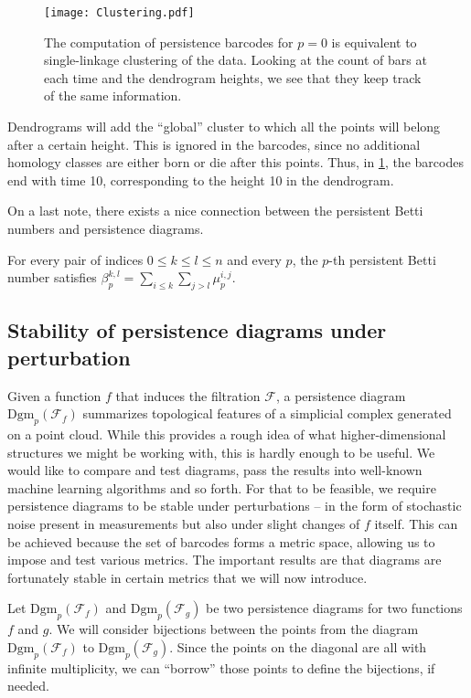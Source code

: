 \begin{figure}[h!]
  \centering
  \texttt{[image: Clustering.pdf]}
  \caption{The computation of persistence barcodes for $p=0$ is equivalent to single-linkage clustering of the data. Looking at the count of bars at each time and the dendrogram heights, we see that they keep track of the same information.}
  \label{fig:clustering}
\end{figure}

Dendrograms will add the ``global'' cluster to which all the points will belong after a certain height. This is ignored in the barcodes, since no additional homology classes are either born or die after this points. Thus, in \ref{fig:clustering}, the barcodes end with time 10, corresponding to the height 10 in the dendrogram.

On a last note, there exists a nice connection between the persistent Betti numbers and persistence diagrams.
\begin{theorem}
  For every pair of indices $0 \leq k \leq l \leq n$ and every $p$, the $p$-th persistent Betti number satisfies $\beta_{p}^{k,l} = \sum_{i \leq k}\sum_{j > l}\mu^{i,j}_{p}$.
\end{theorem}

\subsection{Stability of persistence diagrams under perturbation}
Given a function $f$ that induces the filtration $\mathcal{F}$, a persistence diagram $\text{Dgm}_{p}(\mathcal{F}_{f})$ summarizes topological features of a simplicial complex generated on a point cloud. While this provides a rough idea of what higher-dimensional structures we might be working with, this is hardly enough to be useful. We would like to compare and test diagrams, pass the results into well-known machine learning algorithms and so forth. For that to be feasible, we require persistence diagrams to be stable under perturbations -- in the form of stochastic noise present in measurements but also under slight changes of $f$ itself. This can be achieved because the set of barcodes forms a metric space, allowing us to impose and test various metrics. The important results are that diagrams are fortunately stable in certain metrics that we will now introduce.

Let $\text{Dgm}_{p}(\mathcal{F}_{f})$ and $\text{Dgm}_{p}(\mathcal{F}_{g})$ be two persistence diagrams for two functions $f$ and $g$. We will consider bijections between the points from the diagram $\text{Dgm}_{p}(\mathcal{F}_{f})$ to $\text{Dgm}_{p}(\mathcal{F}_{g})$. Since the points on the diagonal are all with infinite multiplicity, we can ``borrow'' those points to define the bijections, if needed.

